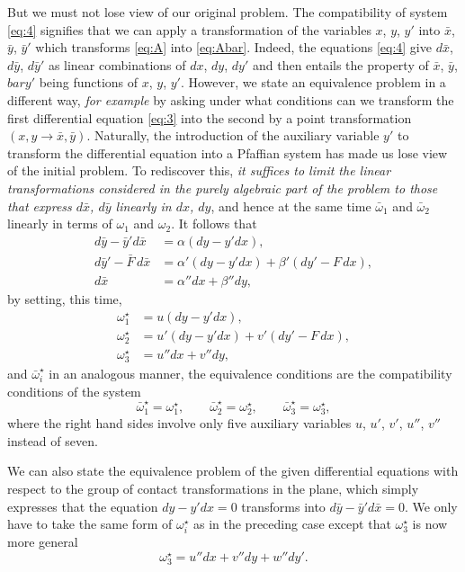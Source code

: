 \documentclass[leqno,11pt]{article}
\theoremstyle{shape1}
\theoremstyle{shape0}
\theoremstyle{shape2}
\theoremstyle{definition}
\begin{document}
But we must not lose view of our original problem. The compatibility of system \eqref{eq:4} signifies that we can apply a transformation of the variables $x$, $y$, $y'$ into $\bar x$, $\bar y$, $\bar y'$ which transforms \eqref{eq:A} into \eqref{eq:Abar}. Indeed, the equations \eqref{eq:4} give $d\bar x$, $d\bar y$, $d\bar y'$ as linear combinations of $dx$, $dy$, $dy'$ and then entails the property of $\bar x$, $\bar y$, $bar y'$ being functions of $x$, $y$, $y'$. However, we state an equivalence problem in a different way, \emph{for example} by asking under what conditions can we transform the first differential equation \eqref{eq:3} into the second by a point transformation $(x,y\rightarrow \bar x, \bar y)$. Naturally, the introduction of the auxiliary variable $y'$ to transform the differential equation into a Pfaffian system has made us lose view of the initial problem. To rediscover this, \emph{it suffices to limit the linear transformations considered in the purely algebraic part of the problem to those that express $d\bar x$, $d\bar y$ linearly in $dx$, $dy$}, and hence at the same time $\bar\omega_{1}$ and $\bar\omega_{2}$ linearly in terms of $\omega_{1}$ and $\omega_{2}$. It follows that
\begin{align*}
  d\bar y-\bar y'd\bar x&=\alpha(dy-y'dx),\\
  d\bar y'-\bar F\, d\bar x&=\alpha'(dy-y'dx)+\beta'(dy'-F\,dx),\\
  d\bar x&=\alpha''dx+\beta''dy,
\end{align*}
by setting, this time,
\begin{align*}
  \omega_{1}^{\star}&=u(dy-y'dx),\\
  \omega_{2}^{\star}&=u'(dy-y'dx)+v'(dy'-F\,dx),\\
  \omega_{3}^{\star}&=u''dx+v''dy,
\end{align*}
and $\bar\omega_{i}^{\star}$ in an analogous manner, the equivalence conditions are the compatibility conditions of the system
\[
  \bar\omega_{1}^{\star}=\omega_{1}^{\star},\qquad
  \bar\omega_{2}^{\star}=\omega_{2}^{\star},\qquad
  \bar\omega_{3}^{\star}=\omega_{3}^{\star},
\]
where the right hand sides involve only five auxiliary variables $u$, $u'$, $v'$, $u''$, $v''$ instead of seven.

We can also state the equivalence problem of the given differential equations with respect to the group of contact transformations in the plane, which simply expresses that the equation $dy-y'dx=0$ transforms into $d\bar y-\bar y'd\bar x=0$. We only have to take the same form of $\omega_{i}^{\star}$ as in the preceding case except that $\omega_{3}^{\star}$ is now more general
\[
\omega_{3}^{\star}=u''dx+v''dy+w''dy'.
\]
\end{document}

